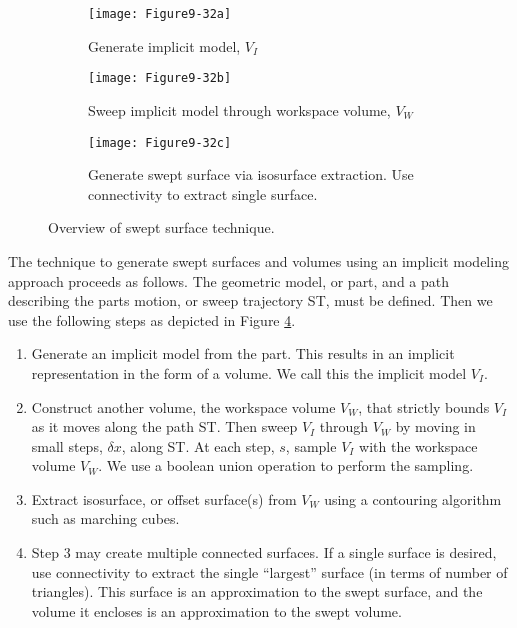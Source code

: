 \begin{figure}[htb]
    \centering
	\begin{subfigure}[h]{0.48\linewidth}
		\texttt{[image: Figure9-32a]}
		\captionsetup{justification=centering}
		\caption{Generate implicit model, $V_I$}
		\label{fig:Figure9-32a}
	\end{subfigure}
	\hfill
	\begin{subfigure}[h]{0.48\linewidth}
		\texttt{[image: Figure9-32b]}
		\captionsetup{justification=centering}
		\caption{Sweep implicit model through workspace volume, $V_W$}
		\label{fig:Figure9-32b}
	\end{subfigure}
	\hfill
	\begin{subfigure}[h]{0.48\linewidth}
		\texttt{[image: Figure9-32c]}
		\captionsetup{justification=centering}
        \caption{Generate swept surface via isosurface extraction. Use connectivity to extract single surface.}
		\label{fig:Figure9-32c}
	\end{subfigure}
	\caption{Overview of swept surface technique.}\label{fig:Figure9-32}
\end{figure}

The technique to generate swept surfaces and volumes using an implicit modeling approach proceeds as follows. The geometric model, or part, and a path describing the parts motion, or sweep trajectory ST, must be defined. Then we use the following steps as depicted in Figure \ref{fig:Figure9-32}.

\begin{enumerate}

\item Generate an implicit model from the part. This results in an implicit representation in the form of a volume. We call this the implicit model $V_I$.

\item Construct another volume, the workspace volume $V_W$, that strictly bounds $V_I$ as it moves along the path ST. Then sweep $V_I$ through $V_W$ by moving in small steps, $\delta x$, along ST. At each step, $s$, sample $V_I$ with the workspace volume $V_W$. We use a boolean union operation to perform the sampling.

\item Extract isosurface, or offset surface(s) from $V_W$ using a contouring algorithm such as marching cubes.

\item Step 3 may create multiple connected surfaces. If a single surface is desired, use connectivity to extract the single ``largest'' surface (in terms of number of triangles). This surface is an approximation to the swept surface, and the volume it encloses is an approximation to the swept volume.

\end{enumerate}


